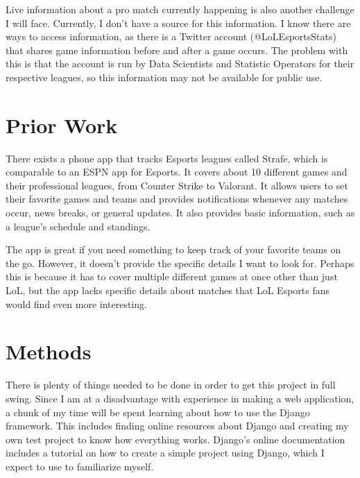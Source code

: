 \documentclass[10pt,twocolumn]{article}
\begin{document}
Live information about a pro match currently happening is also another challenge I will face.
Currently, I don't have a source for this information.
I know there are ways to access information, as there is a Twitter account (@LoLEsportsStats) that shares game information before and after a game occurs.
The problem with this is that the account is run by Data Scientists and Statistic Operators for their respective leagues, so this information may not be available for public use.

\section{Prior Work} %
There exists a phone app that tracks Esports leagues called Strafe, which is comparable to an ESPN app for Esports.
It covers about 10 different games and their professional leagues, from Counter Strike to Valorant.
It allows users to set their favorite games and teams and provides notifications whenever any matches occur, news breaks, or general updates.
It also provides basic information, such as a league's schedule and standings.

The app is great if you need something to keep track of your favorite teams on the go.
However, it doesn't provide the specific details I want to look for.
Perhaps this is because it has to cover multiple different games at once other than just LoL, but the app lacks specific details about matches that LoL Esports fans would find even more interesting.

\section{Methods}

There is plenty of things needed to be done in order to get this project in full swing.
Since I am at a disadvantage with experience in making a web application, a chunk of my time will be spent learning about how to use the Django framework.
This includes finding online resources about Django and creating my own test project to know how everything works.
Django's online documentation includes a tutorial on how to create a simple project using Django, which I expect to use to familiarize myself.
\end{document}

